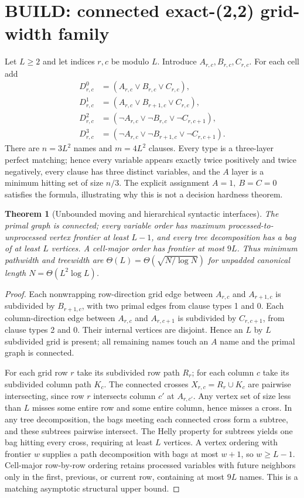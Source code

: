 \documentclass[11pt]{article}
\newtheorem{theorem}{Theorem}
\begin{document}
\section{BUILD: connected exact-(2,2) grid-width family}
Let $L\ge2$ and let indices $r,c$ be modulo $L$. Introduce $A_{r,c},B_{r,c},C_{r,c}$. For each cell add
\begin{align*}
D^0_{r,c}&=(A_{r,c}\vee B_{r,c}\vee C_{r,c}),\\
D^1_{r,c}&=(A_{r,c}\vee B_{r+1,c}\vee C_{r,c}),\\
D^2_{r,c}&=(\neg A_{r,c}\vee\neg B_{r,c}\vee\neg C_{r,c+1}),\\
D^3_{r,c}&=(\neg A_{r,c}\vee\neg B_{r+1,c}\vee\neg C_{r,c+1}).
\end{align*}
There are $n=3L^2$ names and $m=4L^2$ clauses. Every type is a three-layer perfect matching; hence every variable appears exactly twice positively and twice negatively, every clause has three distinct variables, and the $A$ layer is a minimum hitting set of size $n/3$. The explicit assignment $A=1,\ B=C=0$ satisfies the formula, illustrating why this is not a decision hardness theorem.
\begin{theorem}[Unbounded moving and hierarchical syntactic interfaces]
The primal graph is connected; every variable order has maximum processed-to-unprocessed vertex frontier at least $L-1$, and every tree decomposition has a bag of at least $L$ vertices. A cell-major order has frontier at most $9L$. Thus minimum pathwidth and treewidth are $\Theta(L)=\Theta(\sqrt{N/\log N})$ for unpadded canonical length $N=\Theta(L^2\log L)$.
\end{theorem}
\begin{proof}
Each nonwrapping row-direction grid edge between $A_{r,c}$ and $A_{r+1,c}$ is subdivided by $B_{r+1,c}$, with two primal edges from clause types 1 and 0. Each column-direction edge between $A_{r,c}$ and $A_{r,c+1}$ is subdivided by $C_{r,c+1}$, from clause types 2 and 0. Their internal vertices are disjoint. Hence an $L$ by $L$ subdivided grid is present; all remaining names touch an $A$ name and the primal graph is connected.

For each grid row $r$ take its subdivided row path $R_r$; for each column $c$ take its subdivided column path $K_c$. The connected crosses $X_{r,c}=R_r\cup K_c$ are pairwise intersecting, since row $r$ intersects column $c'$ at $A_{r,c'}$. Any vertex set of size less than $L$ misses some entire row and some entire column, hence misses a cross. In any tree decomposition, the bags meeting each connected cross form a subtree, and these subtrees pairwise intersect. The Helly property for subtrees yields one bag hitting every cross, requiring at least $L$ vertices. A vertex ordering with frontier $w$ supplies a path decomposition with bags at most $w+1$, so $w\ge L-1$. Cell-major row-by-row ordering retains processed variables with future neighbors only in the first, previous, or current row, containing at most $9L$ names. This is a matching asymptotic structural upper bound.
\end{proof}
\end{document}
